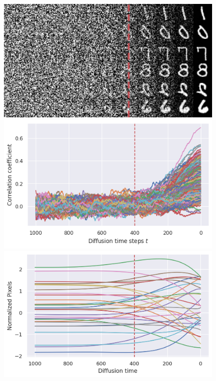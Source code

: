 \begin{figure}[ht!]
\centering
{}
    \includegraphics[width=\linewidth]{figs/imgs/mnist_progressive_generation.jpg}
\endminipage\hfill
{}
  \includegraphics[width=\linewidth]{figs/plots/mnist_correlation_trajectories.png}
\endminipage\hfill
{}
  \includegraphics[width=\linewidth]{figs/plots/mnist_normalized_trajectories.png}

\end{figure}
